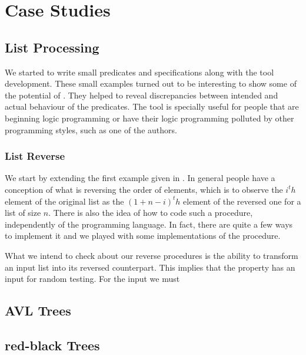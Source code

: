 
\section{Case Studies}
\label{sec:case-studies}

\subsection{List Processing}
We started to write small predicates and specifications along with the
tool development.
%
These small examples turned out to be interesting to show some of the
potential of \plqc{}.
%
They helped to reveal discrepancies between intended and actual
behaviour of the predicates.
%
The tool is specially useful for people that are beginning logic
programming or have their logic programming polluted by other
programming styles, such as one of the authors.


\subsubsection{List Reverse}
We start by extending the first example given in
.
%
In general people have a conception of what is reversing the order of
elements, which is to observe the $i^th$ element of the original list as
the $(1+n-i)^th$ element of the reversed one for a list of size $n$.
%
There is also the idea of how to code such a procedure, independently of
the programming language.
%
In fact, there are quite a few ways to implement it and we played with
some implementations of the procedure.


What we intend to check about our reverse procedures is the ability to
transform an input list into its reversed counterpart.
%
This implies that the property has an input for random testing.
%
For the input we must 
\subsection{AVL Trees}
\subsection{red-black Trees}



